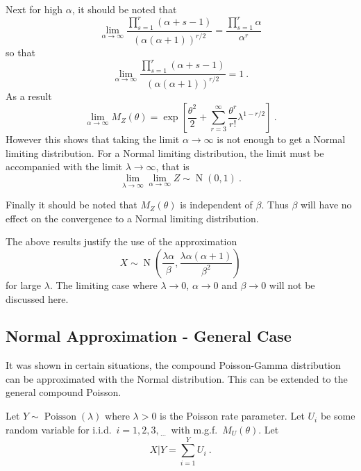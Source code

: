 \documentclass[12pt, a4paper]{memoir}
\DeclareMathOperator{\normal}{N}
\DeclareMathOperator{\poisson}{Poisson}
\newcommand{\dotdotdot}{_{\phantom{.}\cdots}}
\begin{document}
Next for high $\alpha$, it should be noted that
\begin{equation*}
\lim_{\alpha\rightarrow\infty}
	\frac{
		\prod_{s=1}^r(\alpha+s-1)
	}
	{(\alpha(\alpha+1))^{r/2}}
=
\frac{
		\prod_{s=1}^r\alpha
	}
	{\alpha^{r}}
\end{equation*}
so that
\begin{equation}
\lim_{\alpha\rightarrow\infty}
	\frac{
		\prod_{s=1}^r(\alpha+s-1)
	}
	{(\alpha(\alpha+1))^{r/2}} = 1 \ .
\end{equation}
As a result
\begin{equation}
\lim_{\alpha\rightarrow\infty}
M_Z(\theta)=
\exp\left[
	\frac{\theta^2}{2}
	+\sum_{r=3}^\infty
		\frac{\theta^r}
		{r!}
		\lambda^{1-r/2}
\right] \ .
\end{equation}
However this shows that taking the limit $\alpha\rightarrow\infty$ is not enough to get a Normal limiting distribution. For a Normal limiting distribution, the limit must be accompanied with the limit $\lambda\rightarrow\infty$, that is
\begin{equation}
\lim_{\lambda\rightarrow\infty}\lim_{\alpha\rightarrow\infty}Z\sim\normal(0,1) \ .
\end{equation}

Finally it should be noted that $M_Z(\theta)$ is independent of $\beta$. Thus $\beta$ will have no effect on the convergence to a Normal limiting distribution.

The above results justify the use of the approximation
\begin{equation}
X\sim\normal\left(\frac{\lambda\alpha}{\beta},\frac{\lambda\alpha(\alpha+1)}{\beta^2}\right)
\end{equation}
for large $\lambda$. The limiting case where $\lambda\rightarrow 0$, $\alpha\rightarrow 0$ and $\beta\rightarrow 0$ will not be discussed here.

\subsection{Normal Approximation - General Case}
It was shown in certain situations, the compound Poisson-Gamma distribution can be approximated with the Normal distribution. This can be extended to the general compound Poisson.

Let $Y\sim\poisson(\lambda)$ where $\lambda>0$ is the Poisson rate parameter. Let $U_i$ be some random variable for i.i.d.~$i=1,2,3,\dotdotdot$ with m.g.f.~$M_U(\theta)$. Let
\begin{equation}
X|Y = \sum_{i=1}^{Y}U_i \ .
\end{equation}
\end{document}

